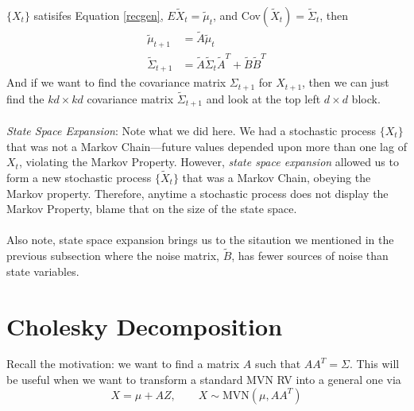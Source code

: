 \documentclass[a4paper,12pt]{scrartcl}
\begin{document}
$\{{X}_t\}$ satisifes Equation \ref{recgen},
$E\tilde{{X}}_t = \tilde{\mu}_t$, and 
Cov$(\tilde{{X}}_t) = \tilde{\Sigma}_t$, then
\begin{align*}
    \tilde{\mu}_{t+1} &= \tilde{A}\tilde{\mu}_t \\
    \tilde{\Sigma}_{t+1} &= \tilde{A} \tilde{\Sigma}_t\tilde{A}^T +
	\tilde{B} \tilde{B}^T
\end{align*}
And if we want to find the covariance matrix $\Sigma_{t+1}$ for 
${X}_{t+1}$, then we can just find the $kd \times kd$ 
covariance matrix $\tilde{\Sigma}_{t+1}$ and look at the top left 
$d\times d$ block.
\\
\\
{\sl State Space Expansion}: Note what we did here.  We had a
stochastic process $\{{X}_{t}\}$ that was not a Markov 
Chain---future values depended upon more than one lag of 
${X}_t$, violating the Markov Property.  However, 
\emph{state space expansion} allowed us to form a new stochastic
process $\{\tilde{{X}}_t\}$ that was a Markov Chain, obeying
the Markov property.  Therefore, anytime a stochastic process 
does not display the Markov Property, blame that on the size of 
the state space.
\\
\\
Also note, state space expansion brings us to the sitaution we
mentioned in the previous subsection where the noise matrix,
$\tilde{B}$, has fewer sources of noise than state variables.


\newpage
\appendix
\section{Cholesky Decomposition}

Recall the motivation: we want to find a matrix $A$ such that
$AA^T = \Sigma$. This will be useful when we want to transform
a standard MVN RV into a general one via
\begin{equation}
    {X} = \mu + A{Z}, \qquad {X}\sim 
	\text{MVN}(\mu, AA^T)
\end{equation}
\end{document}
